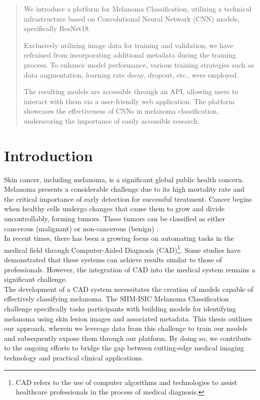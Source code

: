 \begin{abstract}

We introduce a platform for Melanoma Classification, utilizing a technical
infrastructure based on Convolutional Neural Network (CNN) models, specifically
ResNet18.

Exclusively utilizing image data for training and validation, we have refrained
from incorporating additional metadata during the training process. To enhance
model performance, various training strategies such as data augmentation,
learning rate decay, dropout, etc., were employed.

The resulting models are accessible through an API, allowing users to interact
with them via a user-friendly web application. The platform showcases the
effectiveness of CNNs in melanoma classification, underscoring the importance
of easily accessible research.

\end{abstract}


\section{Introduction}

Skin cancer, including melanoma, is a significant global public health concern.
Melanoma presents a considerable challenge due to its high mortality rate and
the critical importance of early detection for successful treatment. Cancer
begins when healthy cells undergo changes that cause them to grow and divide
uncontrollably, forming tumors. These tumors can be classified as either
cancerous (malignant) or non-cancerous (benign) \cite{Melanoma}. \\

In recent times, there has been a growing focus on automating tasks in the
medical field through Computer-Aided Diagnosis (CAD)\footnote{CAD refers to the
use of computer algorithms and technologies to assist healthcare professionals
in the process of medical diagnosis.}. Some studies
\cite{EpidemiologySkinCancer} \cite{SkinCancerDeepLearning} \cite{SkinCancerDeepNN} have demonstrated that
these systems can achieve results similar to those of professionals. However,
the integration of CAD into the medical system remains a significant challenge.
\\

The development of a CAD system necessitates the creation of models capable of
effectively classifying melanoma. The SIIM-ISIC Melanoma Classification
challenge specifically tasks participants with building models for identifying
melanoma using skin lesion images and associated metadata. This thesis outlines
our approach, wherein we leverage data from this challenge to train our models
and subsequently expose them through our platform. By doing so, we contribute
to the ongoing efforts to bridge the gap between cutting-edge medical imaging
technology and practical clinical applications.

